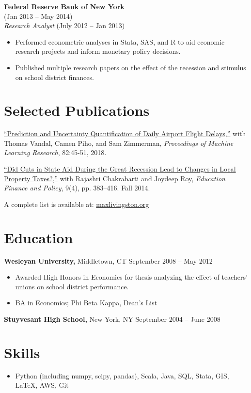 \documentclass{res}
\begin{document}
\begin{resume}
  {\bf Federal Reserve Bank of New York}  \\
   \hspace{3pt} (Jan 2013 -- May 2014)\\
        {\it Research Analyst} \hspace{20pt} (July 2012 -- Jan 2013)
        \vspace{2pt}
  \begin{itemize} \itemsep 2.0pt %
  \item Performed econometric analyses in Stata, SAS, and R to aid economic research projects and inform monetary policy decisions.
  \item Published multiple research papers on the effect of the recession and stimulus on school district finances.
  \end{itemize}
  
  \section{Selected Publications} 
  \href{http://proceedings.mlr.press/v82/vandal18a.html}{``Prediction and Uncertainty Quantification of Daily Airport Flight Delays,''} with Thomas Vandal, Camen Piho, and Sam Zimmerman, {\it Proceedings of Machine Learning Research}, 82:45-51, 2018.

  \href{http://bit.ly/20jcEax}{``Did Cuts in State Aid During the Great Recession Lead to Changes in Local Property Taxes?,''} with Rajashri Chakrabarti and Joydeep Roy, {\it Education Finance and Policy}, 9(4), pp. 383--416. Fall 2014.



  A complete list is available at: \href{http://maxlivingston.org}{maxlivingston.org}

\section{Education} 
\vspace{2pt}
       {\bf Wesleyan University,} Middletown, CT \hfill September 2008 -- May 2012
  \begin{itemize} \itemsep -2pt
  \item Awarded High Honors in Economics for thesis analyzing the effect of teachers' unions on school district performance.
  \item BA in Economics; Phi Beta Kappa, Dean's List
  \end{itemize}

  {\bf Stuyvesant High School,} New York, NY \hfill September 2004 -- June 2008

  \section{Skills}
  \begin{itemize} \itemsep -2pt
  \item Python (including numpy, scipy, pandas), Scala, Java, SQL, Stata, GIS, \LaTeX, AWS, Git
  \end{itemize}

\end{resume} 
\end{document}
